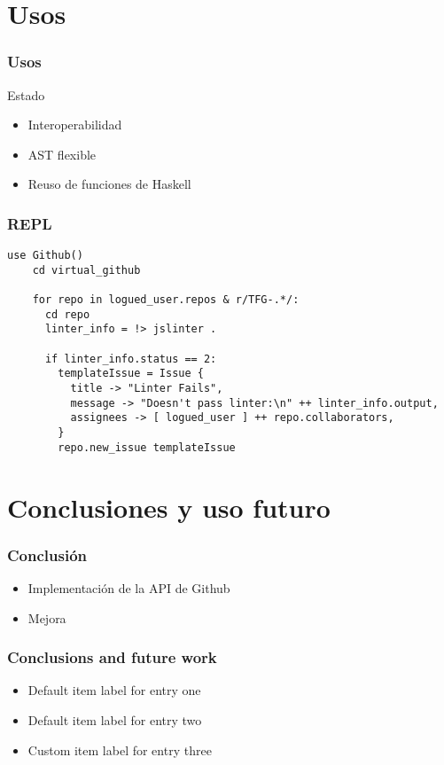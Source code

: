 \section{Usos}
\begin{frame}
  \frametitle{Usos}
  \begin{center}
    Estado
    \begin{itemize}
      \item Interoperabilidad
      \item AST flexible
      \item Reuso de funciones de Haskell
    \end{itemize}
  \end{center}

  \frametitle{REPL}


  \begin{lstlisting}[language=scriptflow]
    use Github()
    cd virtual_github

    for repo in logued_user.repos & r/TFG-.*/:
      cd repo
      linter_info = !> jslinter .

      if linter_info.status == 2:
        templateIssue = Issue {
          title -> "Linter Fails",
          message -> "Doesn't pass linter:\n" ++ linter_info.output,
          assignees -> [ logued_user ] ++ repo.collaborators,
        }
        repo.new_issue templateIssue
  \end{lstlisting}


\end{frame}

\section{Conclusiones y uso futuro}
\begin{frame}
  \frametitle{Conclusión}
  \begin{center}
    \begin{itemize}
      \item Implementación de la API de Github
      \item Mejora
    \end{itemize}
  \end{center}

  \frametitle{Conclusions and future work}
  \begin{center}
    \begin{itemize}
      \item  Default item label for entry one
      \item  Default item label for entry two
      \item  Custom item label for entry three
    \end{itemize}
  \end{center}

\end{frame}
